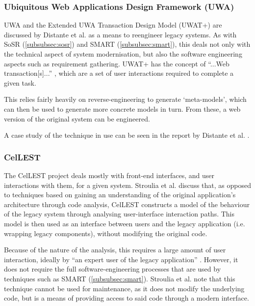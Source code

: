\documentclass[12pt,journal,compsoc]{IEEEtran}
\begin{document}
\subsubsection{Ubiquitous Web Applications Design Framework (UWA)}
\label{subsubsec:uwa}
UWA \cite{UWAConsortium2002} and the Extended UWA Transaction Design Model (UWAT+) \cite{Distante2005} are discussed by Distante et al. \cite{Distante2006} as a means to reengineer legacy systems. As with SoSR (\autoref{subsubsec:sosr}) and SMART (\autoref{subsubsec:smart}), this deals not only with the technical aspect of system modernisation, but also the software engineering aspects such as requirement gathering. UWAT+ has the concept of ``...Web transaction[s]...'' \cite{Distante2006}, which are a set of user interactions required to complete a given task.

This relies fairly heavily on reverse-engineering to generate `meta-models', which can then be used to generate more concrete models in turn. From these, a web version of the original system can be engineered.

A case study of the technique in use can be seen in the report by Distante et al. \cite{Distante:2006:RLA:1134285.1134353}.

\subsubsection{CelLEST}
\label{subsubsec:cellest}
The CelLEST project \cite{Stroulia2000} deals mostly with front-end interfaces, and user interactions with them, for a given system. Stroulia et al. \cite{Stroulia2002} discuss that, as opposed to techniques based on gaining an understanding of the original application's architecture through code analysis, CelLEST constructs a model of the behaviour of the legacy system through analysing user-interface interaction paths. This model is then used as an interface between users and the legacy application (i.e. wrapping legacy components), without modifying the original code.

Because of the nature of the analysis, this requires a large amount of user interaction, ideally by ``an expert user of the legacy application'' \cite{Stroulia2002}. However, it does not require the full software-engineering processes that are used by techniques such as SMART (\autoref{subsubsec:smart}). Stroulia et al. note that this technique cannot be used for maintenance, as it does not modify the underlying code, but is a means of providing access to said code through a modern interface.
\end{document}
